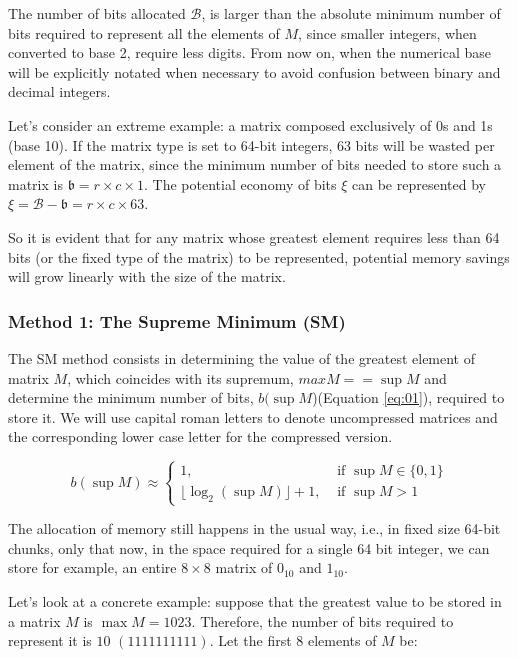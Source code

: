 \documentclass[10pt]{article}
\begin{document}
The number of bits allocated $\mathcal{B}$, is larger than the absolute minimum number of bits required to represent all the elements of $M$, since smaller integers, when converted to base 2, require less digits. From now on, when the numerical base will be explicitly notated when necessary to avoid confusion between binary and decimal integers.  

Let's consider an extreme example: a matrix composed exclusively of 0s and 1s (base 10). If the matrix type is set to 64-bit integers, 63 bits will be wasted per element of the matrix, since the minimum number of bits needed to store such a matrix is $\mathfrak{b} = r \times c \times 1$. The potential economy of bits $\xi$ can be represented by $\xi = \mathcal{B} - \mathfrak{b} =  r \times c \times 63$.


So it is evident that for any matrix whose greatest element requires less than 64 bits (or the fixed type of the matrix) to be represented, potential memory savings will grow linearly with the size of the matrix.

\subsubsection*{Method 1: The Supreme Minimum (SM)}

The SM method consists in determining the value of the greatest element of matrix $M$, which coincides with its supremum, $max M == \sup M$  and determine the minimum number of bits, $b(\sup M$)(Equation \ref{eq:01}), required to store it. We will use capital roman letters to denote uncompressed matrices and the corresponding lower case letter for the compressed version.

\begin{equation} \label{eq:01}
 b(\sup M) \approx \begin{cases}
	1, &  \text{ if } \sup M \in \{0,1\} \\ 
	\lfloor \log_2(\sup M)  \rfloor + 1,  & \text{ if } \sup M > 1  
	\end{cases}
\end{equation}

The allocation of memory still happens in the usual way, i.e., in fixed size 64-bit chunks, only that now, in the space required for a single 64 bit integer, we can store for example, an entire $8\times 8$ matrix of $0_{10}$ and $1_{10}$. 

Let's look at a concrete example: suppose that the greatest value to be stored in a matrix $M$ is $\max M=1023$. Therefore, the number of bits required to represent it is $10$ $(1111111111)$. Let the first 8 elements of $M$ be:
\end{document}
